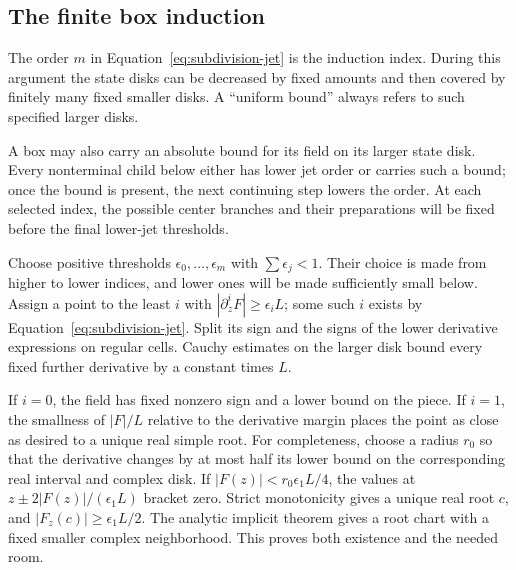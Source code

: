 \subsection{The finite box induction}

The order $m$ in Equation~\eqref{eq:subdivision-jet} is the induction
index.  During this argument the state disks can be decreased by fixed
amounts and then covered by finitely many fixed smaller disks.  A
``uniform bound'' always refers to such specified larger disks.

A box may also carry an absolute bound for its field on its larger state
disk.  Every nonterminal child below either has lower jet order or
carries such a bound; once the bound is present, the next continuing step
lowers the order.  At each selected index, the possible center branches and their
preparations will be fixed before the final lower-jet thresholds.

Choose positive thresholds
$\epsilon_0,\ldots,\epsilon_m$ with
$\sum\epsilon_j<1$.  Their choice is made from higher to lower indices,
and lower ones will be made sufficiently small below.  Assign a point
to the least $i$ with $|\partial_z^iF|\ge\epsilon_iL$; some such $i$
exists by Equation~\eqref{eq:subdivision-jet}.  Split its sign and the
signs of the lower derivative expressions on regular cells.  Cauchy
estimates on the larger disk bound every fixed further derivative by
a constant times $L$.

If $i=0$, the field has fixed nonzero sign and a lower bound on the piece.
If $i=1$, the smallness of $|F|/L$ relative to the derivative margin
places the point as close as desired to a unique real simple root.
For completeness, choose a radius $r_0$ so that the derivative changes by
at most half its lower bound on the corresponding real interval and
complex disk.  If $|F(z)|<r_0\epsilon_1L/4$, the values at
$z\pm2|F(z)|/(\epsilon_1L)$ bracket zero.  Strict monotonicity gives a
unique real root $c$, and $|F_z(c)|\ge\epsilon_1L/2$.
The analytic implicit theorem gives a root chart with a fixed smaller
complex neighborhood.  This proves both existence and the needed room.

